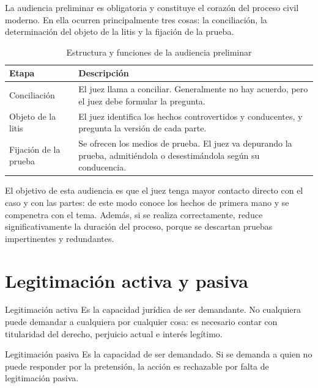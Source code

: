 \documentclass[12pt,oneside]{book}
\begin{document}
La audiencia preliminar es obligatoria y constituye el corazón del proceso civil moderno. En ella ocurren principalmente tres cosas: la conciliación, la determinación del objeto de la litis y la fijación de la prueba.

\begin{table}[H]
\centering
\begin{tabularx}{\textwidth}{
    >{\raggedright\arraybackslash}p{}
    >{\raggedright\arraybackslash}X
}
\toprule
\textbf{Etapa} & \textbf{Descripción} \\
\midrule
Conciliación & El juez llama a conciliar. Generalmente no hay acuerdo, pero el juez debe formular la pregunta. \\
Objeto de la litis & El juez identifica los hechos controvertidos y conducentes, y pregunta la versión de cada parte. \\
Fijación de la prueba & Se ofrecen los medios de prueba. El juez va depurando la prueba, admitiéndola o desestimándola según su conducencia. \\
\bottomrule
\end{tabularx}
\caption{Estructura y funciones de la audiencia preliminar}
\end{table}

El objetivo de esta audiencia es que el juez tenga mayor contacto directo con el caso y con las partes: de este modo conoce los hechos de primera mano y se compenetra con el tema. Además, si se realiza correctamente, reduce significativamente la duración del proceso, porque se descartan pruebas impertinentes y redundantes.

\section{Legitimación activa y pasiva}

\begin{definition}{Legitimación activa}
Es la capacidad jurídica de ser demandante. No cualquiera puede demandar a cualquiera por cualquier cosa: es necesario contar con titularidad del derecho, perjuicio actual e interés legítimo.
\end{definition}

\begin{definition}{Legitimación pasiva}
Es la capacidad de ser demandado. Si se demanda a quien no puede responder por la pretensión, la acción es rechazable por falta de legitimación pasiva.
\end{definition}
\end{document}

